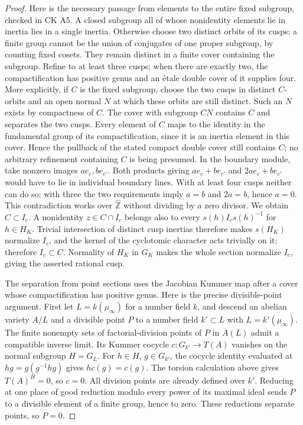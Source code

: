 \begin{proof}
Here is the necessary passage from elements to the entire fixed
subgroup, checked in CK A5. A closed subgroup all of whose nonidentity
elements lie in inertia lies in a single inertia. Otherwise choose
two distinct orbits of its cusps: a finite group cannot be the union
of conjugates of one proper subgroup, by counting fixed cosets.
They remain distinct in a finite cover containing the subgroup.
Refine to at least three cusps; when there are exactly two, the
compactification has positive genus and an \'etale double cover of
it supplies four. More explicitly, if $C$ is the fixed subgroup,
choose the two cusps in distinct $C$-orbits and an open normal
$N$ at which these orbits are still distinct. Such an $N$ exists
by compactness of $C$. The cover with subgroup $CN$ contains $C$
and separates the two cusps. Every element of $C$ maps to the
identity in the fundamental group of its compactification,
since it is an inertia element in this cover. Hence the pullback
of the stated compact double cover still contains $C$; no
arbitrary refinement containing $C$ is being presumed.
In the boundary module, take nonzero images
$ae_c,be_{c'}$. Both products giving $ae_c+be_{c'}$ and
$2ae_c+be_{c'}$ would have to lie in individual boundary lines.
With at least four cusps neither can do so; with three the two
requirements imply $a=b$ and $2a=b$, hence $a=0$. This contradiction
works over $\widehat{\mathbb Z}$ without dividing by a zero divisor.
We obtain $C\subset I_c$. A nonidentity $z\in C\cap I_c$ belongs
also to every $s(h)I_cs(h)^{-1}$ for $h\in H_K$. Trivial intersection
of distinct cusp inertias therefore makes $s(H_K)$ normalize $I_c$,
and the kernel of the cyclotomic character acts trivially on it;
therefore $I_c\subset C$. Normality of $H_K$ in $G_K$ makes the whole
section normalize $I_c$, giving the asserted rational cusp.

The separation from point sections uses the Jacobian Kummer map
after a cover whose compactification has positive genus. Here is
the precise divisible-point argument. First let $L=k(\mu_\infty)$
for a number field $k$, and descend an abelian variety $A/L$ and
a divisible point $P$ to a number field $k'\subset L$ with
$L=k'(\mu_\infty)$. The finite nonempty sets of factorial-division
points of $P$ in $A(L)$ admit a compatible inverse limit. Its
Kummer cocycle $c:G_{k'}\to T(A)$ vanishes on the normal subgroup
$H=G_L$. For $h\in H$, $g\in G_{k'}$, the cocycle identity evaluated
at $hg=g(g^{-1}hg)$ gives $h c(g)=c(g)$. The torsion calculation
above gives $T(A)^H=0$, so $c=0$. All division points are already
defined over $k'$. Reducing at one place of good reduction modulo
every power of its maximal ideal sends $P$ to a divisible element
of a finite group, hence to zero. These reductions separate points,
so $P=0$.


\end{proof}
